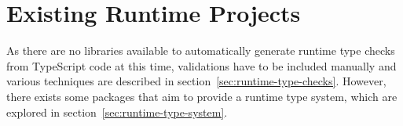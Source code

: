 \section{Existing Runtime Projects}
\label{sec:existing-projects}

As there are no libraries available to automatically generate runtime type checks from TypeScript code at this time, validations have to be included manually and various techniques are described in section~\ref{sec:runtime-type-checks}. However, there exists some packages that aim to provide a runtime type system, which are explored in section~\ref{sec:runtime-type-system}.

